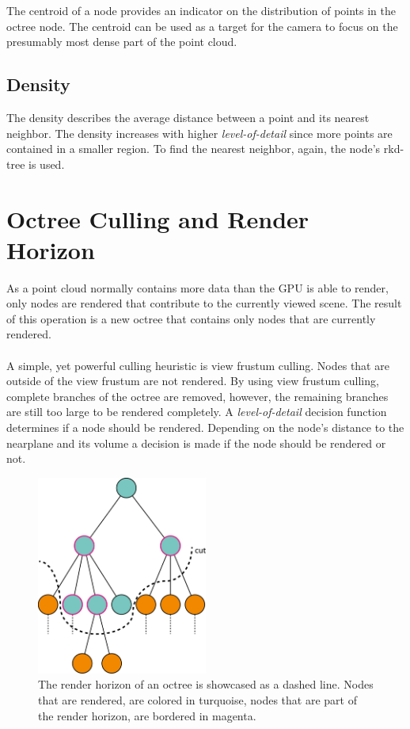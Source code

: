The centroid of a node provides an indicator on the distribution of points in the octree node. The centroid can be used as a target for the camera to focus on the presumably most dense part of the point cloud. 


\subsection{Density}

The density describes the average distance between a point and its nearest neighbor. The density increases with higher \textit{level-of-detail} since more points are contained in a smaller region. To find the nearest neighbor, again, the node's rkd-tree is used. 


\section{Octree Culling and Render Horizon}
\label{sec:renderHorizon}

As a point cloud normally contains more data than the GPU is able to render, only nodes are rendered that contribute to the currently viewed scene. The result of this operation is a new octree that contains only nodes that are currently rendered. 
\\
\\
A simple, yet powerful culling heuristic is view frustum culling. Nodes that are outside of the view frustum are not rendered. By using view frustum culling, complete branches of the octree are removed, however, the remaining branches are still too large to be rendered completely. A \textit{level-of-detail} decision function determines if a node should be rendered. Depending on the node's distance to the nearplane and its volume a decision is made if the node should be rendered or not. 

\begin{figure}
    \centering
    \includegraphics[width=0.5\textwidth]{Octree/renderHorizon.png}
    \caption{The render horizon of an octree is showcased as a dashed line. Nodes that are rendered, are colored in turquoise, nodes that are part of the render horizon, are bordered in magenta. }
    \label{fig:renderHorizon}
\end{figure}


